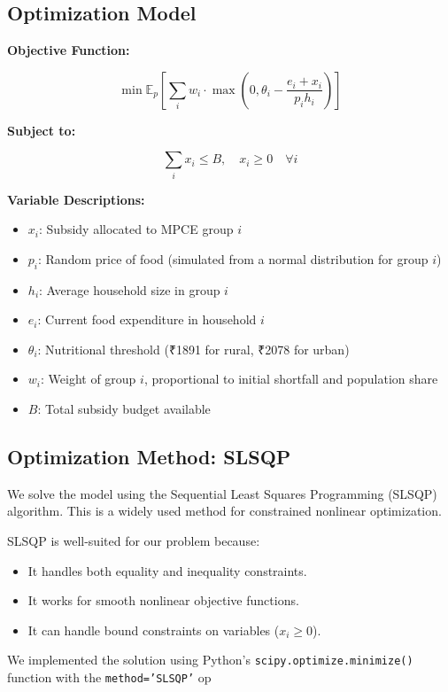 \documentclass[12pt]{article}
\begin{document}
\subsection{Optimization Model}
\textbf{Objective Function:}

\[
\min \mathbb{E}_p \left[ \sum_i w_i \cdot \max\left(0, \theta_i - \frac{e_i + x_i}{p_i h_i}\right) \right]
\]

\textbf{Subject to:}

\[
\sum_i x_i \leq B, \quad x_i \geq 0 \quad \forall i
\]

\textbf{Variable Descriptions:}
\begin{itemize}
    \item $x_i$: Subsidy allocated to MPCE group $i$
    \item $p_i$: Random price of food (simulated from a normal distribution for group $i$)
    \item $h_i$: Average household size in group $i$
    \item $e_i$: Current food expenditure in household $i$
    \item $\theta_i$: Nutritional threshold (₹1891 for rural, ₹2078 for urban)
    \item $w_i$: Weight of group $i$, proportional to initial shortfall and population share
    \item $B$: Total subsidy budget available
\end{itemize}

\subsection{Optimization Method: SLSQP}
We solve the model using the Sequential Least Squares Programming (SLSQP) algorithm. This is a widely used method for constrained nonlinear optimization.

SLSQP is well-suited for our problem because:
\begin{itemize}
    \item It handles both equality and inequality constraints.
    \item It works for smooth nonlinear objective functions.
    \item It can handle bound constraints on variables ($x_i \geq 0$).
\end{itemize}

We implemented the solution using Python’s \texttt{scipy.optimize.minimize()} function with the \texttt{method='SLSQP'} op


\end{document}
